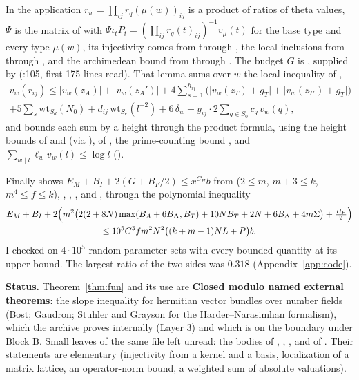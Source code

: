\documentclass[11pt]{article}
\newcommand{\sE}{\textbf{Closed modulo named external theorems}}
\theoremstyle{remark}
\begin{document}
In the application $r_w=\prod_{ij}r_q(\mu(w))_{ij}$ is a product of ratios of theta values, $\Psi$ is the matrix of  with $\Psi\iota_t P_t=(\prod_{ij}r_q(t)_{ij})^{-1}v_\mu(t)$ for the base type and every type $\mu(w)$, its injectivity comes from  through , the local inclusions from  through , and the archimedean bound from  through . The budget $G$ is , supplied by  (:105, first 175 lines read). That lemma sums over $w$ the local inequality of ,
\begin{multline*}
v_w(r_{ij})\le\lvert v_w(z_A)\rvert+\lvert v_w(z_A')\rvert+4\sum_{s=1}^{h_{ij}}\bigl(\lvert v_w(z_T)+g_T\rvert+\lvert v_w(z_{T'})+g_T\rvert\bigr)\\
+5\sum_s\mathrm{wt}_{S_d}(N_0)+d_{ij}\,\mathrm{wt}_{S_e}(l^{-2})+6\,\delta_w+y_{ij}\cdot2\sum_{q\in S_0}c_q\,v_w(q),
\end{multline*}
and bounds each sum by a height through the product formula, using the height bounds of  and  (via ), of , the prime-counting bound , and $\sum_{w\mid l}\ell_wv_w(l)\le\log l$ ().

Finally  shows $E_M+B_I+2(G+B_F/2)\le x^{C_H}b$ from  ($2\le m$, $m+3\le k$, $m^4\le f\le k$), , , ,  and , through the polynomial inequality 
\begin{multline*}
E_M+B_I+2\Bigl(m^2\bigl(2(2+8N)\max(B_A+6B_\Delta,B_T)+10NB_T+2N+6B_\Delta+4m\Sigma\bigr)+\tfrac{B_F}{2}\Bigr)\\
\le10^5C^3fm^2N^2\bigl((k+m-1)NL+P\bigr)b .
\end{multline*}
I checked  on $4\cdot10^5$ random parameter sets with every bounded quantity at its upper bound. The largest ratio of the two sides was $0.318$ (Appendix~\ref{app:code}).

\noindent\textbf{Status.} Theorem~\ref{thm:fun} and its use are \sE{}: the slope inequality for hermitian vector bundles over number fields (Bost; Gaudron; Stuhler and Grayson for the Harder--Narasimhan formalism), which the archive proves internally (Layer 3) and which is on the boundary under Block B. Small leaves of the same file left unread: the bodies of , , , and of . Their statements are elementary (injectivity from a kernel and a basis, localization of a matrix lattice, an operator-norm bound, a weighted sum of absolute valuations).
\end{document}
